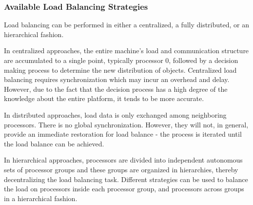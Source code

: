 \subsubsection{Available Load Balancing Strategies}

\label{lbStrategy}

Load balancing can be performed in either a centralized, a fully distributed,
or an hierarchical fashion.

In centralized approaches, the entire machine's load and communication
structure are accumulated to a single point, typically processor 0, followed by
a decision making process to determine the new distribution of \charmpp
objects. Centralized load balancing requires synchronization which may incur an
overhead and delay. However, due to the fact that the decision process has a
high degree of the knowledge about the entire platform, it tends to be more
accurate.

In distributed approaches, load data is only exchanged among 
neighboring processors. There is no global synchronization. However,
they will not, in general, provide an immediate restoration for load balance -
the process is iterated until the load balance can be achieved.

In hierarchical approaches, processors are divided into independent autonomous
sets of processor groups and these groups are organized in hierarchies,
thereby decentralizing the load balancing task. Different strategies can be
used to balance the load on processors inside each processor group, and
processors across groups in a hierarchical fashion.

